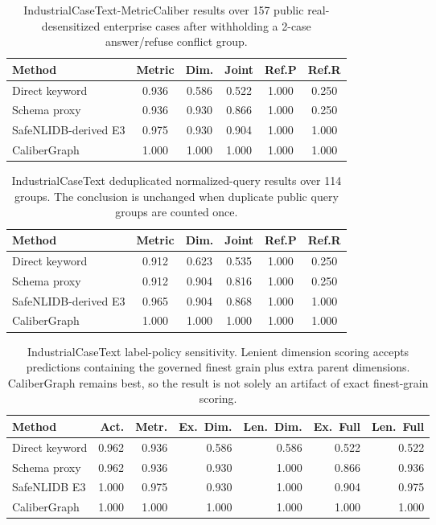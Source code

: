 \documentclass[letterpaper]{article}
\begin{document}
\begin{table}[h]
\centering
\scriptsize
\begin{tabular}{lccccc}
\toprule
Method & Metric & Dim. & Joint & Ref.P & Ref.R \\
\midrule
Direct keyword & 0.936 & 0.586 & 0.522 & 1.000 & 0.250 \\
Schema proxy & 0.936 & 0.930 & 0.866 & 1.000 & 0.250 \\
SafeNLIDB-derived E3 & 0.975 & 0.930 & 0.904 & 1.000 & 1.000 \\
CaliberGraph & 1.000 & 1.000 & 1.000 & 1.000 & 1.000 \\
\bottomrule
\end{tabular}
\caption{IndustrialCaseText-MetricCaliber results over 157 public real-desensitized enterprise cases after withholding a 2-case answer/refuse conflict group.}
\end{table}

\begin{table}[h]
\centering
\scriptsize
\begin{tabular}{lccccc}
\toprule
Method & Metric & Dim. & Joint & Ref.P & Ref.R \\
\midrule
Direct keyword & 0.912 & 0.623 & 0.535 & 1.000 & 0.250 \\
Schema proxy & 0.912 & 0.904 & 0.816 & 1.000 & 0.250 \\
SafeNLIDB-derived E3 & 0.965 & 0.904 & 0.868 & 1.000 & 1.000 \\
CaliberGraph & 1.000 & 1.000 & 1.000 & 1.000 & 1.000 \\
\bottomrule
\end{tabular}
\caption{IndustrialCaseText deduplicated normalized-query results over 114 groups. The conclusion is unchanged when duplicate public query groups are counted once.}
\end{table}

\begin{table}[h]
\centering
\scriptsize
\setlength{\tabcolsep}{1.5pt}
\begin{tabular}{lrrrrrr}
\toprule
Method & Act. & Metr. & Ex.\ Dim. & Len.\ Dim. & Ex.\ Full & Len.\ Full \\
\midrule
Direct keyword & 0.962 & 0.936 & 0.586 & 0.586 & 0.522 & 0.522 \\
Schema proxy & 0.962 & 0.936 & 0.930 & 1.000 & 0.866 & 0.936 \\
SafeNLIDB E3 & 1.000 & 0.975 & 0.930 & 1.000 & 0.904 & 0.975 \\
CaliberGraph & 1.000 & 1.000 & 1.000 & 1.000 & 1.000 & 1.000 \\
\bottomrule
\end{tabular}
\caption{IndustrialCaseText label-policy sensitivity. Lenient dimension scoring accepts predictions containing the governed finest grain plus extra parent dimensions. CaliberGraph remains best, so the result is not solely an artifact of exact finest-grain scoring.}
\end{table}
\end{document}
